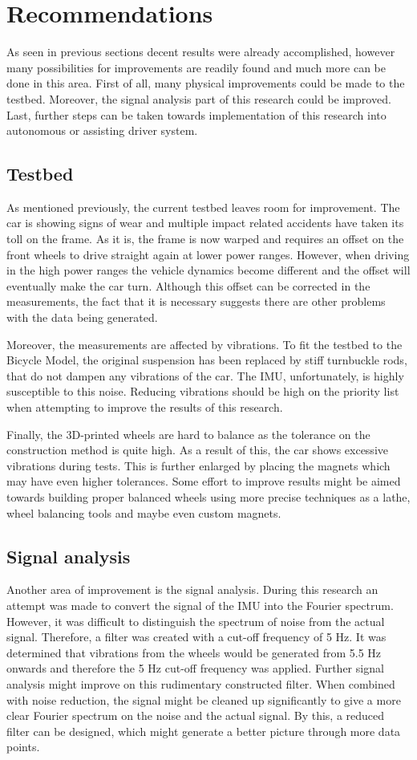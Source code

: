 \section{Recommendations}
As seen in previous sections decent results were already accomplished, however many possibilities for improvements are readily found and much more can be done in this area. First of all, many physical improvements could be made to the testbed. Moreover, the signal analysis part of this research could be improved. Last, further steps can be taken towards implementation of this research into autonomous or assisting driver system.

\subsection{Testbed}
As mentioned previously, the current testbed leaves room for improvement. The car is showing signs of wear and multiple impact related accidents have taken its toll on the frame. As it is, the frame is now warped and requires an offset on the front wheels to drive straight again at lower power ranges. However, when driving in the high power ranges the vehicle dynamics become different and the offset will eventually make the car turn. Although this offset can be corrected in the measurements, the fact that it is necessary suggests there are other problems with the data being generated.

Moreover, the measurements are affected by vibrations. To fit the testbed to the Bicycle Model, the original suspension has been replaced by stiff turnbuckle rods, that do not dampen any vibrations of the car. The IMU, unfortunately, is highly susceptible to this noise. Reducing vibrations should be high on the priority list when attempting to improve the results of this research.

Finally, the 3D-printed wheels are hard to balance as the tolerance on the construction method is quite high. As a result of this, the car shows excessive vibrations during tests. This is further enlarged by placing the magnets which may have even higher tolerances. Some effort to improve results might be aimed towards building proper balanced wheels using more precise techniques as a lathe, wheel balancing tools and maybe even custom magnets.

\subsection{Signal analysis}
Another area of improvement is the signal analysis. During this research an attempt was made to convert the signal of the IMU into the Fourier spectrum. However, it was difficult to distinguish the spectrum of noise from the actual signal. Therefore, a filter was created with a cut-off frequency of 5 Hz. It was determined that vibrations from the wheels would be generated from 5.5 Hz onwards and therefore the 5 Hz cut-off frequency was applied. Further signal analysis might improve on this rudimentary constructed filter. When combined with noise reduction, the signal might be cleaned up significantly to give a more clear Fourier spectrum on the noise and the actual signal. By this, a reduced filter can be designed, which might generate a better picture through more data points.  
